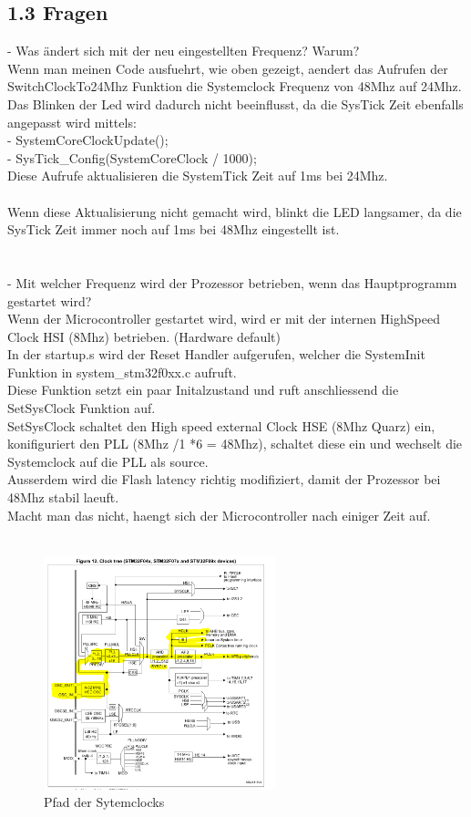 \documentclass{report}
\begin{document}
\subsection*{1.3 Fragen}
- Was ändert sich mit der neu eingestellten Frequenz? Warum?\\
Wenn man meinen Code ausfuehrt, wie oben gezeigt, aendert das Aufrufen der SwitchClockTo24Mhz Funktion die Systemclock Frequenz von 48Mhz auf 24Mhz.\\
Das Blinken der Led wird dadurch nicht beeinflusst, da die SysTick Zeit ebenfalls angepasst wird mittels:\\
- SystemCoreClockUpdate();\\
- SysTick\_Config(SystemCoreClock / 1000);\\
Diese Aufrufe aktualisieren die SystemTick Zeit auf 1ms bei 24Mhz.\\\\
Wenn diese Aktualisierung nicht gemacht wird, blinkt die LED langsamer, da die SysTick Zeit immer noch auf 1ms bei 48Mhz eingestellt ist.\\\\\\
-  Mit welcher Frequenz wird der Prozessor betrieben, wenn das Hauptprogramm gestartet wird? \\
Wenn der Microcontroller gestartet wird, wird er mit der internen HighSpeed Clock HSI (8Mhz) betrieben. (Hardware default)\\
In der startup.s wird der Reset Handler aufgerufen, welcher die SystemInit Funktion in system\_stm32f0xx.c aufruft.\\
Diese Funktion setzt ein paar Initalzustand und ruft anschliessend die SetSysClock Funktion auf.\\
SetSysClock schaltet den High speed external Clock HSE (8Mhz Quarz) ein, konifiguriert den PLL (8Mhz /1 *6 = 48Mhz), schaltet diese ein und wechselt die Systemclock auf die PLL als source.\\
Ausserdem wird die Flash latency richtig modifiziert, damit der Prozessor bei 48Mhz stabil laeuft.\\
Macht man das nicht, haengt sich der Microcontroller nach einiger Zeit auf.\\\\
\begin{figure}[h!]
	\centering
	\includegraphics[width=0.6\textwidth]{./Pic.png}
	\caption{Pfad der Sytemclocks}
	\label{Task1_address0x0}
\end{figure}
\end{document}
